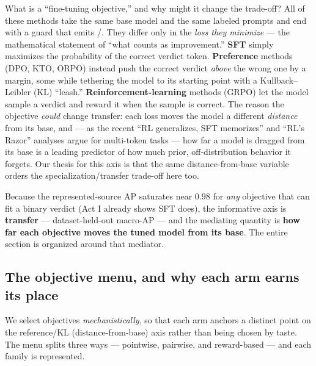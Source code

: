 \begin{background}{What is a ``fine-tuning objective,'' and why might it change the trade-off?}
All of these methods take the same base model and the same labeled prompts and end with a guard that
emits /. They differ only in the \emph{loss they minimize} --- the mathematical
statement of ``what counts as improvement.'' \textbf{SFT} simply maximizes the probability of the correct
verdict token. \textbf{Preference} methods (DPO, KTO, ORPO) instead push the correct verdict \emph{above}
the wrong one by a margin, some while tethering the model to its starting point with a Kullback--Leibler
(KL) ``leash.'' \textbf{Reinforcement-learning} methods (GRPO) let the model sample a verdict and reward
it when the sample is correct. The reason the objective \emph{could} change transfer: each loss moves the
model a different \emph{distance} from its base, and --- as the recent ``RL generalizes, SFT memorizes''
and ``RL's Razor'' analyses argue for multi-token tasks --- how far a model is dragged from its base is a
leading predictor of how much prior, off-distribution behavior it forgets. Our thesis for this axis is
that the same distance-from-base variable orders the specialization/transfer trade-off here too.
\end{background}

Because the represented-source AP saturates near $0.98$ for \emph{any} objective that can fit a
binary verdict (Act I already shows SFT does), the informative axis is \textbf{transfer} --- dataset-held-out
macro-AP --- and the mediating quantity is \textbf{how far each objective moves the tuned model from its
base}. The entire section is organized around that mediator.

\subsection{The objective menu, and why each arm earns its place}
\label{sec:actII-menu}

We select objectives \emph{mechanistically}, so that each arm anchors a distinct point on the
reference/KL (distance-from-base) axis rather than being chosen by taste. The menu splits three ways ---
pointwise, pairwise, and reward-based --- and each family is represented.

